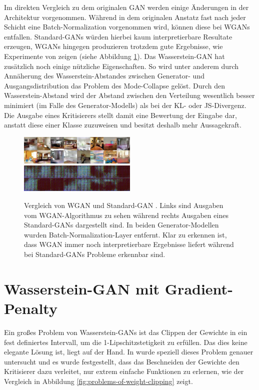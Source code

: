 Im direkten Vergleich zu dem originalen GAN \cite{goodfellow2014generative}
werden einige Änderungen in der Architektur vorgenommen. Während in dem
originalen Anstatz fast nach jeder Schicht eine Batch-Normalization
vorgenommen wird, können diese bei WGANs entfallen. Standard-GANs würden
hierbei kaum interpretierbare Resultate erzeugen, WGANs hingegen produzieren
trotzdem gute Ergebnisse, wie Experimente von \cite{arjovsky2017wasserstein}
zeigen (siehe Abbildung \ref{fig:wgan-gan-no-batchnorm}). Das Wasserstein-GAN
hat zusätzlich noch einige nützliche Eigenschaften. So wird unter anderem
durch Annäherung des Wasserstein-Abstandes zwischen Generator- und
Ausgangsdistribution das Problem des Mode-Collapse gelöst.  Durch den
Wasserstein-Abstand wird der Abstand zwischen den Verteilung wesentlich besser
minimiert (im Falle des Generator-Modells) als bei der KL- oder JS-Divergenz.
Die Ausgabe eines Kritisierers stellt damit eine Bewertung der Eingabe dar,
anstatt diese einer Klasse zuzuweisen und besitzt deshalb mehr Aussagekraft.

\begin{figure}
\includegraphics[width=0.5\textwidth]{images/image-022.png}
\includegraphics[width=0.5\textwidth]{images/image-024.png}
\caption{Vergleich von WGAN und Standard-GAN \cite{arjovsky2017wasserstein}.
    Links sind Ausgaben vom WGAN-Algorithmus zu sehen während rechts Ausgaben
    eines Standard-GANs dargestellt sind. In beiden Generator-Modellen wurden
    Batch-Normalization-Layer entfernt. Klar zu erkennen ist, dass WGAN immer
    noch interpretierbare Ergebnisse liefert während bei Standard-GANs Probleme
    erkennbar sind.}
\label{fig:wgan-gan-no-batchnorm}
\end{figure}

\section{Wasserstein-GAN mit Gradient-Penalty}
Ein großes Problem von Wasserstein-GANs ist das Clippen der Gewichte in ein
fest definiertes Intervall, um die 1-Lipschitzstetigkeit zu erfüllen. Das dies
keine elegante Lösung ist, liegt auf der Hand. In \cite{gulrajani2017improved}
wurde speziell dieses Problem genauer untersucht und es wurde festgestellt,
dass das Beschneiden der Gewichte den Kritisierer dazu verleitet, nur extrem
einfache Funktionen zu erlernen, wie der Vergleich in Abbildung
\ref{fig:problems-of-weight-clipping} zeigt. 

